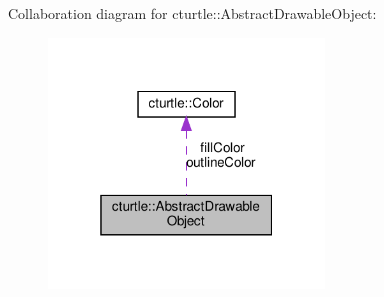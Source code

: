 Collaboration diagram for cturtle\+:\+:Abstract\+Drawable\+Object\+:
\nopagebreak
\begin{figure}[H]
\begin{center}
\leavevmode
\includegraphics[width=208pt]{classcturtle_1_1AbstractDrawableObject__coll__graph}
\end{center}
\end{figure}
